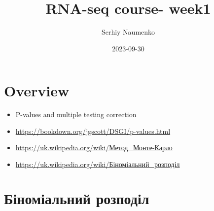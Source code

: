 \documentclass[
  10pt,
]{article}
\title{RNA-seq course- week1}
\author{Serhiy Naumenko}
\date{2023-09-30}
\providecommand{\tightlist}{%
  \setlength{\itemsep}{0pt}\setlength{\parskip}{0pt}}
\begin{document}
\maketitle

{
\hypersetup{linkcolor=}
\setcounter{tocdepth}{2}
\tableofcontents
}
\hypertarget{overview}{%
\section{Overview}\label{overview}}

\begin{itemize}
\tightlist
\item
  P-values and multiple testing correction
\item
  \url{https://bookdown.org/jgscott/DSGI/p-values.html}
\item
  \url{https://uk.wikipedia.org/wiki/Метод_Монте-Карло}
\item
  \url{https://uk.wikipedia.org/wiki/Біноміальний_розподіл}
\end{itemize}

\newpage

\hypertarget{ux431ux456ux43dux43eux43cux456ux430ux43bux44cux43dux438ux439-ux440ux43eux437ux43fux43eux434ux456ux43b}{%
\section{Біноміальний
розподіл}\label{ux431ux456ux43dux43eux43cux456ux430ux43bux44cux43dux438ux439-ux440ux43eux437ux43fux43eux434ux456ux43b}}
\end{document}
